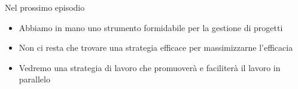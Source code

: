 \documentclass[presentation]{beamer}
\begin{document}
\begin{frame}{Nel prossimo episodio}
	\begin{itemize}
		\item Abbiamo in mano uno strumento formidabile per la gestione di progetti
		\item Non ci resta che trovare una strategia efficace per massimizzarne l'efficacia
		\item Vedremo una strategia di lavoro che promuoverà e faciliterà il lavoro in parallelo
	\end{itemize}
\end{frame}
\end{document}
